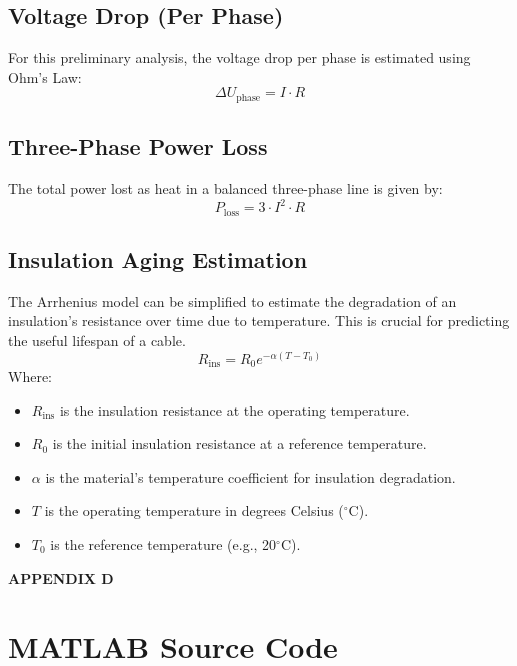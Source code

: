 \documentclass[12pt, a4paper]{article}
\begin{document}
\subsection{Voltage Drop (Per Phase)}
For this preliminary analysis, the voltage drop per phase is estimated using Ohm's Law:
\begin{equation}
    \Delta U_{\text{phase}} = I \cdot R
\end{equation}

\subsection{Three-Phase Power Loss}
The total power lost as heat in a balanced three-phase line is given by:
\begin{equation}
    P_{\text{loss}} = 3 \cdot I^2 \cdot R
\end{equation}

\subsection{Insulation Aging Estimation}
The Arrhenius model can be simplified to estimate the degradation of an insulation's resistance over time due to temperature. This is crucial for predicting the useful lifespan of a cable.
\begin{equation}
    R_{\text{ins}} = R_0 e^{-\alpha(T - T_0)}
\end{equation}
Where:
\begin{itemize}
    \item $R_{\text{ins}}$ is the insulation resistance at the operating temperature.
    \item $R_0$ is the initial insulation resistance at a reference temperature.
    \item $\alpha$ is the material's temperature coefficient for insulation degradation.
    \item $T$ is the operating temperature in degrees Celsius ($^{\circ}$C).
    \item $T_0$ is the reference temperature (e.g., 20$^{\circ}$C).
\end{itemize}


\begin{center}\textbf{APPENDIX D}\end{center}
\section{MATLAB Source Code}
\end{document}
